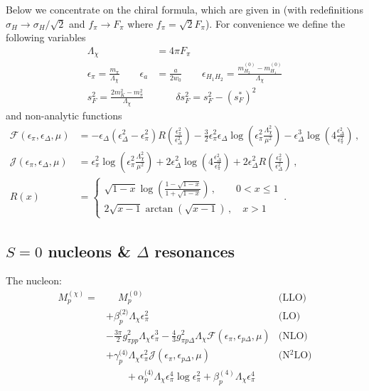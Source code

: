 \documentclass[12pt,tightenlines, raggedbottom, prd, notitlepage]{revtex4-1}
\begin{document}
Below we concentrate on the chiral formula, which are given in \cite{Tiburzi:2008bk} (with redefinitions $\sigma_H \rightarrow \sigma_H / \sqrt{2}$ and $f_\pi \rightarrow F_\pi$ where $f_\pi= \sqrt{2} F_\pi$). For convenience we define the following variables
\begin{align*}
\Lambda_\chi &= 4 \pi F_\pi  \\
\epsilon_\pi = \frac{m_\pi}{\Lambda_\chi} \qquad \epsilon_a &= \frac{a}{2w_0} \qquad \epsilon_{H_1 H_2}= \frac{m_{H_2}^{(0)} - m_{H_1}^{(0)}}{\Lambda_\chi}  \\
s_F^2 = \frac{2m_K^2 -m_\pi^2}{\Lambda_\chi} &\qquad \delta s_F^2 = s_F^2 - (s_F^*)^2
\end{align*}
and non-analytic functions
\begin{align}
\mathcal{F}(\epsilon_\pi, \epsilon_\Delta, \mu) 
&= -\epsilon_\Delta \left(\epsilon_\Delta^2 - \epsilon_\pi^2 \right) R\left( \frac{\epsilon_\pi^2}{\epsilon_\Delta^2}\right)
- \frac{3}{2} \epsilon_\pi^2 \epsilon_\Delta \log \left( \epsilon_\pi^2 \frac{\Lambda_\chi^2}{\mu^2} \right)
- \epsilon_\Delta^3 \log \left( 4 \frac{\epsilon_\Delta^2}{\epsilon_\pi^2} \right) \, ,\\
\mathcal{J}(\epsilon_\pi, \epsilon_\Delta, \mu) &=
\epsilon_\pi^2 \log \left( \epsilon_\pi^2 \frac{\Lambda_\chi^2}{\mu^2} \right)
+ 2\epsilon_\Delta^2 \log \left( 4 \frac{\epsilon_\Delta^2}{\epsilon_\pi^2} \right)
+ 2 \epsilon_\Delta^2 R\left( \frac{\epsilon_\pi^2}{\epsilon_\Delta^2}\right) \, ,\\
R(x) &= \begin{cases} \label{eq:defn_r}
\sqrt{1 - x} \log \left( \frac{1-\sqrt{1-x}}{1+\sqrt{1-x}}\right)\, , \qquad 0 < x \leq 1\\
2 \sqrt{x - 1} \arctan\left( \sqrt{x - 1}\right) \, , \quad x > 1
\end{cases} \, .
\end{align}

\subsection{$S=0$ nucleons \& $\Delta$ resonances}
The nucleon:
\begin{align*}
    M_p^{(\chi)} = &\phantom{+}  M_p^{(0)} & \text{(LLO)} \\
    &+ \beta^\text{(2)}_p \Lambda_\chi \epsilon_\pi^2 & \text{(LO)} \\
    &- \frac{3\pi}{2} g_{\pi pp}^2 \Lambda_{\chi} \epsilon_\pi^3
    - \frac{4}{3} g_{\pi p\Delta}^2 \Lambda_{\chi} \mathcal{F}(\epsilon_\pi, \epsilon_{p\Delta}, \mu) & \text{(NLO)} \\
    &+ \gamma_p^\text{(4)} \Lambda_\chi \epsilon_\pi^2 
    \mathcal{J} (\epsilon_\pi, \epsilon_{p \Delta}, \mu) &\text{(N$^2$LO)} \\
    &\qquad + \alpha_p^\text{(4)} \Lambda_{\chi} \epsilon_\pi^4 \log{\epsilon_\pi^2} + \beta_{p}^{(4)} \Lambda_\chi \epsilon_\pi^4
\end{align*}
\end{document}
